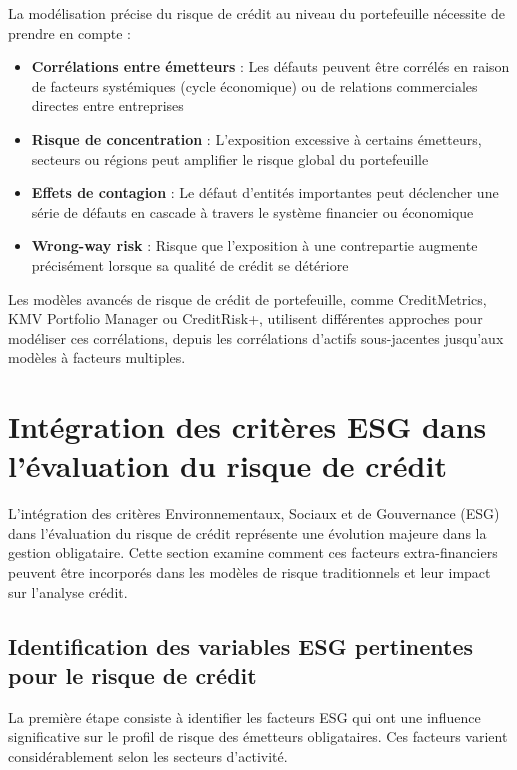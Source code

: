 La modélisation précise du risque de crédit au niveau du portefeuille nécessite de prendre en compte :

\begin{itemize}
    \item \textbf{Corrélations entre émetteurs} : Les défauts peuvent être corrélés en raison de facteurs systémiques (cycle économique) ou de relations commerciales directes entre entreprises
    
    \item \textbf{Risque de concentration} : L'exposition excessive à certains émetteurs, secteurs ou régions peut amplifier le risque global du portefeuille
    
    \item \textbf{Effets de contagion} : Le défaut d'entités importantes peut déclencher une série de défauts en cascade à travers le système financier ou économique
    
    \item \textbf{Wrong-way risk} : Risque que l'exposition à une contrepartie augmente précisément lorsque sa qualité de crédit se détériore
\end{itemize}

Les modèles avancés de risque de crédit de portefeuille, comme CreditMetrics, KMV Portfolio Manager ou CreditRisk+, utilisent différentes approches pour modéliser ces corrélations, depuis les corrélations d'actifs sous-jacentes jusqu'aux modèles à facteurs multiples.

\section{Intégration des critères ESG dans l'évaluation du risque de crédit}

L'intégration des critères Environnementaux, Sociaux et de Gouvernance (ESG) dans l'évaluation du risque de crédit représente une évolution majeure dans la gestion obligataire. Cette section examine comment ces facteurs extra-financiers peuvent être incorporés dans les modèles de risque traditionnels et leur impact sur l'analyse crédit.

\subsection{Identification des variables ESG pertinentes pour le risque de crédit}

La première étape consiste à identifier les facteurs ESG qui ont une influence significative sur le profil de risque des émetteurs obligataires. Ces facteurs varient considérablement selon les secteurs d'activité.

